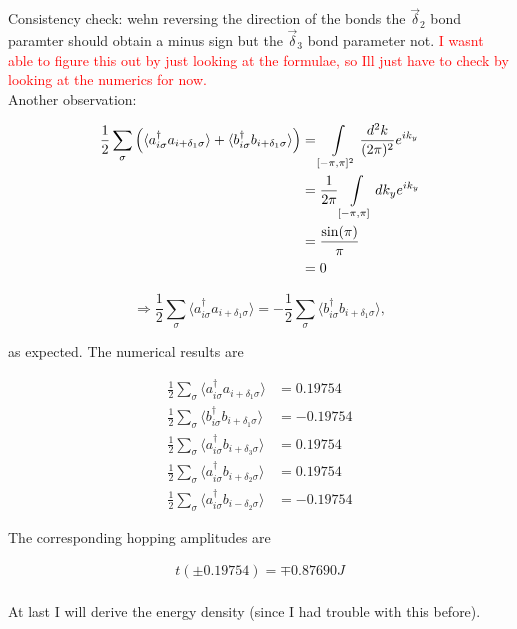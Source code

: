 \documentclass[../../../main.tex]{subfiles}
\begin{document}
Consistency check: wehn reversing the direction of the bonds the $\vec{\delta}_2$ bond paramter should obtain a minus sign but the $\vec{\delta}_3$ bond parameter not. \textcolor{red}{ I wasnt able to figure this out by just looking at the formulae, so Ill just have to check by looking at the numerics for now.}\\

Another observation:

\begin{align}
	\frac12\sum_\sigma \left(\langle a_{i\sigma}^\dagger a_{i+\delta_1\sigma} \rangle +  \langle b_{i\sigma}^\dagger b_{i+\delta_1\sigma}\rangle \right) &=  \int\limits_{[-\pi,\pi]^2} \frac{d^2k}{(2\pi)^2} e^{ik_y} \notag \\
	&= \frac{1}{2\pi} \int\limits_{[-\pi,\pi]} dk_y e^{ik_y} \notag \\
	&= \frac{\sin(\pi)}{\pi} \notag \\
	&= 0
\end{align}

\begin{equation}
	\Rightarrow \frac12\sum_\sigma \langle a_{i\sigma}^\dagger a_{i+\delta_1\sigma}\rangle = -\frac12\sum_\sigma \langle b_{i\sigma}^\dagger b_{i+\delta_1\sigma} \rangle,
\end{equation}

as expected. The numerical results are

\begin{align}
	\frac12	\sum_\sigma\langle a_{i\sigma}^\dagger a_{i+\delta_1\sigma } \rangle &= 0.19754\\
	\frac12 \sum_\sigma \langle b_{i\sigma}^\dagger b_{i+\delta_1\sigma} \rangle &= -0.19754\\
	\frac12 \sum_\sigma \langle a_{i\sigma}^\dagger b_{i+\delta_3\sigma} \rangle &= 0.19754\\
	\frac12 \sum_\sigma \langle a_{i\sigma}^\dagger b_{i+\delta_2\sigma} \rangle &= 0.19754 \\
	\frac12 \sum_\sigma \langle a_{i\sigma}^\dagger b_{i-\delta_2\sigma} \rangle &= -0.19754
\end{align}

The corresponding hopping amplitudes are 

\begin{gather}
	t(\pm0.19754) = \mp0.87690J \\
\end{gather}

At last I will derive the energy density (since I had trouble with this before).
\end{document}
